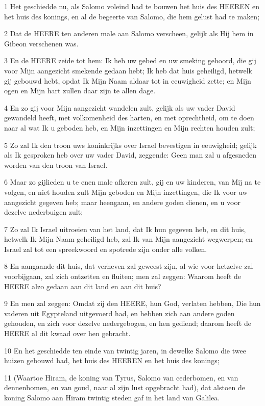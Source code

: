 \par 1 Het geschiedde nu, als Salomo voleind had te bouwen het huis des HEEREN en het huis des konings, en al de begeerte van Salomo, die hem gelust had te maken;
\par 2 Dat de HEERE ten anderen male aan Salomo verscheen, gelijk als Hij hem in Gibeon verschenen was.
\par 3 En de HEERE zeide tot hem: Ik heb uw gebed en uw smeking gehoord, die gij voor Mijn aangezicht smekende gedaan hebt; Ik heb dat huis geheiligd, hetwelk gij gebouwd hebt, opdat Ik Mijn Naam aldaar tot in eeuwigheid zette; en Mijn ogen en Mijn hart zullen daar zijn te allen dage.
\par 4 En zo gij voor Mijn aangezicht wandelen zult, gelijk als uw vader David gewandeld heeft, met volkomenheid des harten, en met oprechtheid, om te doen naar al wat Ik u geboden heb, en Mijn inzettingen en Mijn rechten houden zult;
\par 5 Zo zal Ik den troon uws koninkrijks over Israel bevestigen in eeuwigheid; gelijk als Ik gesproken heb over uw vader David, zeggende: Geen man zal u afgesneden worden van den troon van Israel.
\par 6 Maar zo gijlieden u te enen male afkeren zult, gij en uw kinderen, van Mij na te volgen, en niet houden zult Mijn geboden en Mijn inzettingen, die Ik voor uw aangezicht gegeven heb; maar heengaan, en andere goden dienen, en u voor dezelve nederbuigen zult;
\par 7 Zo zal Ik Israel uitroeien van het land, dat Ik hun gegeven heb, en dit huis, hetwelk Ik Mijn Naam geheiligd heb, zal Ik van Mijn aangezicht wegwerpen; en Israel zal tot een spreekwoord en spotrede zijn onder alle volken.
\par 8 En aangaande dit huis, dat verheven zal geweest zijn, al wie voor hetzelve zal voorbijgaan, zal zich ontzetten en fluiten; men zal zeggen: Waarom heeft de HEERE alzo gedaan aan dit land en aan dit huis?
\par 9 En men zal zeggen: Omdat zij den HEERE, hun God, verlaten hebben, Die hun vaderen uit Egypteland uitgevoerd had, en hebben zich aan andere goden gehouden, en zich voor dezelve nedergebogen, en hen gediend; daarom heeft de HEERE al dit kwaad over hen gebracht.
\par 10 En het geschiedde ten einde van twintig jaren, in dewelke Salomo die twee huizen gebouwd had, het huis des HEEREN en het huis des konings;
\par 11 (Waartoe Hiram, de koning van Tyrus, Salomo van cederbomen, en van dennenbomen, en van goud, naar al zijn lust opgebracht had), dat alstoen de koning Salomo aan Hiram twintig steden gaf in het land van Galilea.
